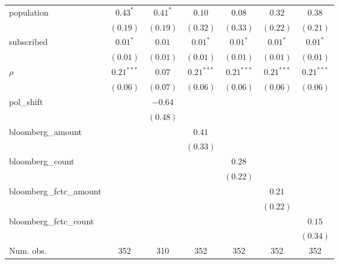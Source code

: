 \begin{table}[!h]
\begin{center}
\begin{tabular}{l c c c c c c }
population              & $0.43^{*}$   & $0.41^{*}$   & $0.10$       & $0.08$       & $0.32$       & $0.38$       \\
                        & $(0.19)$     & $(0.19)$     & $(0.32)$     & $(0.33)$     & $(0.22)$     & $(0.21)$     \\
subscribed              & $0.01^{*}$   & $0.01$       & $0.01^{*}$   & $0.01^{*}$   & $0.01^{*}$   & $0.01^{*}$   \\
                        & $(0.01)$     & $(0.01)$     & $(0.01)$     & $(0.01)$     & $(0.01)$     & $(0.01)$     \\
$\rho$                  & $0.21^{***}$ & $0.07$       & $0.21^{***}$ & $0.21^{***}$ & $0.21^{***}$ & $0.21^{***}$ \\
                        & $(0.06)$     & $(0.07)$     & $(0.06)$     & $(0.06)$     & $(0.06)$     & $(0.06)$     \\
pol\_shift              &              & $-0.64$      &              &              &              &              \\
                        &              & $(0.48)$     &              &              &              &              \\
bloomberg\_amount       &              &              & $0.41$       &              &              &              \\
                        &              &              & $(0.33)$     &              &              &              \\
bloomberg\_count        &              &              &              & $0.28$       &              &              \\
                        &              &              &              & $(0.22)$     &              &              \\
bloomberg\_fctc\_amount &              &              &              &              & $0.21$       &              \\
                        &              &              &              &              & $(0.22)$     &              \\
bloomberg\_fctc\_count  &              &              &              &              &              & $0.15$       \\
                        &              &              &              &              &              & $(0.34)$     \\
\midrule
Num. obs.               & 352          & 310          & 352          & 352          & 352          & 352          \\

\end{tabular}
\end{center}
\end{table}
